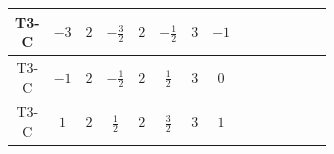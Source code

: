 \documentclass[8pt]{article}
\begin{document}
\begin{landscape}
\begin{longtable}{@{}cccccccc >{\raggedright\arraybackslash}p{0.21\linewidth} >{\raggedright\arraybackslash}p{0.21\linewidth} >{\raggedright\arraybackslash}p{0.21\linewidth}@{}}
T3-C & $-3$ & $2$ & $-\frac{3}{2}$ & $2$ & $-\frac{1}{2}$ & $3$ & $-1$ & \scriptsize\adjustbox{max width=\linewidth}{$\begin{gathered} +D_{\mu _1}\left(S_{2,j_1}\right){}^{\dagger } D_{\mu _1}\left(S_{2,j_1}\right)\end{gathered}$} & \scriptsize\adjustbox{max width=\linewidth}{$\begin{gathered} -\overline{F_{j_1,r_1}}\, F_{j_1,r_1} M_F\end{gathered}$} & \scriptsize\adjustbox{max width=\linewidth}{$\begin{gathered} +i \overline{F_{j_1,r_1}}\, \gamma ^{\mu _1}\, D_{\mu _1}\left(F_{j_1,r_1}\right)\end{gathered}$} \\
\midrule
T3-C & $-1$ & $2$ & $-\frac{1}{2}$ & $2$ & $\frac{1}{2}$ & $3$ & $0$ & \scriptsize\adjustbox{max width=\linewidth}{$\begin{gathered} +D_{\mu _1}\left(S_{2,j_1}\right){}^{\dagger } D_{\mu _1}\left(S_{2,j_1}\right)\end{gathered}$} & \scriptsize\adjustbox{max width=\linewidth}{$\begin{gathered} -\frac{1}{2} F_{j_1,r_1}{}^T\, C\, F_{j_1,r_1} M_F\end{gathered}$} & \scriptsize\adjustbox{max width=\linewidth}{$\begin{gathered} +\frac{1}{2} i F_{j_1,r_1}{}^T\, C\, \gamma ^{\mu _1}\, D_{\mu _1}\left(F_{j_1,r_1}\right)\end{gathered}$} \\
\midrule
T3-C & $1$ & $2$ & $\frac{1}{2}$ & $2$ & $\frac{3}{2}$ & $3$ & $1$ & \scriptsize\adjustbox{max width=\linewidth}{$\begin{gathered} +D_{\mu _1}\left(S_{2,j_1}\right){}^{\dagger } D_{\mu _1}\left(S_{2,j_1}\right)\end{gathered}$} & \scriptsize\adjustbox{max width=\linewidth}{$\begin{gathered} -\overline{F_{j_1,r_1}}\, F_{j_1,r_1} M_F\end{gathered}$} & \scriptsize\adjustbox{max width=\linewidth}{$\begin{gathered} +i \overline{F_{j_1,r_1}}\, \gamma ^{\mu _1}\, D_{\mu _1}\left(F_{j_1,r_1}\right)\end{gathered}$} \\
\midrule

\end{longtable}
\end{landscape}
\end{document}
